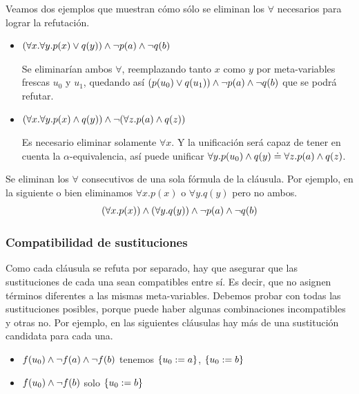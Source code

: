 \begin{ejemplo}
Veamos dos ejemplos que muestran cómo sólo se eliminan los $\forall$ necesarios para lograr la refutación.

\begin{itemize}
    \item \(
    (\forall x. \forall y . p(x) \vee q(y)) \wedge \neg p(a) \wedge \neg q(b)
    \)

    Se eliminarían ambos $\forall$, reemplazando tanto $x$ como $y$ por meta-variables frescas $u_0$ y $u_1$, quedando así $(p(u_0) \vee q(u_1)) \wedge \neg p(a) \wedge \neg q(b)$ que se podrá refutar.

    \item \(
        (\forall x. \forall y . p(x) \wedge q(y)) \wedge \neg (\forall z. p(a) \wedge q(z))
    \)

    Es necesario eliminar solamente $\forall x$. Y la unificación será capaz de tener en cuenta la $\alpha$-equivalencia, así puede unificar $\forall y . p(u_0) \wedge q(y) \doteq \forall z. p(a) \wedge q(z)$.
\end{itemize}
\end{ejemplo}

\begin{ejemplo}
    Se eliminan los $\forall$ consecutivos de una sola fórmula de la cláusula. Por ejemplo, en la siguiente o bien eliminamos $\forall x . p(x)$ o $\forall y . q(y)$ pero no ambos.
\[
    (\forall x . p(x)) \wedge (\forall y . q(y)) \wedge \neg p(a) \wedge \neg q(b)
\]
\end{ejemplo}


\subsubsection{Compatibilidad de sustituciones}

Como cada cláusula se refuta por separado, hay que asegurar que las sustituciones de cada una sean compatibles entre sí. Es decir, que no asignen términos diferentes a las mismas meta-variables. Debemos probar con todas las sustituciones posibles, porque puede haber algunas combinaciones incompatibles y otras no. Por ejemplo, en las siguientes cláusulas hay más de una sustitución candidata para cada una.

\begin{itemize}
    \item $f(u_0) \wedge \neg f(a) \wedge \neg f(b)$ tenemos $\{u_0 := a\}$, $\{u_0 := b\}$
    \item $f(u_0) \wedge \neg f(b)$ solo $\{u_0 := b\}$
\end{itemize}

